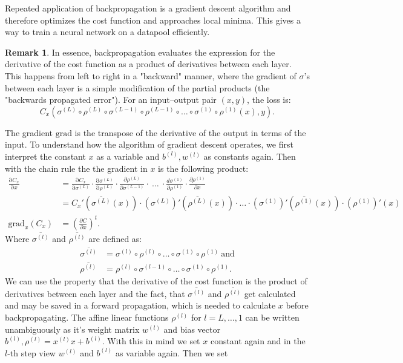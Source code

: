 \documentclass{article}
\theoremstyle{definition}
\newtheorem{remark}[theorem]{Remark}
\begin{document}
Repeated application of backpropagation is a gradient descent algorithm and therefore optimizes the cost function and approaches local minima. This gives a way to train a neural network on a datapool efficiently.

\begin{remark}
\label{com:back_prop_madness}
In essence, backpropagation evaluates the expression for the derivative of the cost function as a product of derivatives between each layer. This happens from left to right in a "backward" manner, where the gradient of $\sigma$'s between each layer is a simple modification of the partial products (the "backwards propagated error")\cite{nielsen2017backpropagation}. For an input–output pair $(x,y)$, the loss is:
$$C_{x}(\sigma^{(L)} \circ \rho^{(L)} \circ \sigma^{(L-1)} \circ \rho^{(L-1)} \circ \dots \circ \sigma^{(1)} \circ \rho^{(1)}(x), y).$$


The gradient $\text{grad}$ is the transpose of the derivative of the output in terms of the input. To understand how the algorithm of gradient descent operates, we first interpret the constant $x$ as a variable and $b^{(l)}, w^{(l)}$ as constants again. Then with the chain rule the the gradient in $x$ is the following product:
\begin{align*}
\frac{\mathrm \partial C_{x}}{\mathrm \partial x} &= \frac{\mathrm \partial C_{x}}{\mathrm \partial \sigma^{(L)}} \cdot \frac{\mathrm \partial \sigma^{(L)}}{\mathrm \partial \rho^{(L)}} \cdot \frac{\partial \rho^{(L)}}{\partial \sigma^{(L-1)}} \cdot \ \ldots \ \cdot \frac{d \sigma^{(1)}}{\partial \rho^{(1)}} \cdot \frac{\partial \rho^{(1)}}{\partial x}\\
 &= C_{x}'(\overline{\sigma^{(L)}}(x)) \cdot (\sigma^{(L)})'(\overline{\rho^{(L)}}(x)) \cdot \dots \cdot (\sigma^{(1)})'(\overline{\rho^{(1)}}(x)) \cdot (\rho^{(1)})'(x) \\
\text{grad}_{x} (C_{x}) &= \left(\frac{\partial C}{\partial x}\right)^{t}.
\end{align*}
Where $\overline{\sigma^{(l)}}$ and $\overline{\rho^{(l)}}$ are defined as:
\begin{align*}
\overline{\sigma^{(l)}} &= \sigma^{(l)} \circ \rho^{(l)} \circ \dots \circ \sigma^{(1)} \circ \rho^{(1)} \ \text{and} \\
\overline{\rho^{(l)}} &= \rho^{(l)} \circ \sigma^{(l-1)} \circ \dots \circ \sigma^{(1)} \circ \rho^{(1)}.
\end{align*}
We can use the property that the derivative of the cost function is the product of derivatives between each layer and the fact, that $\overline{\sigma^{(l)}}$ and $\overline{\rho^{(l)}}$ get calculated and may be saved in a forward propagation, which is needed to calculate $x$ before backpropagating. The affine linear functions $\rho^{(l)}$ for $l=L, \dots , 1$ can be written unambiguously as it's weight matrix $w^{(l)}$ and bias vector $b^{(l)}, \rho^{(l)} = x^{(l)} x + b^{(l)}$. With this in mind we set $x$ constant again and in the $l$-th step view $w^{(l)}$ and $b^{(l)}$ as variable again. Then we set


\end{remark}
\end{document}
